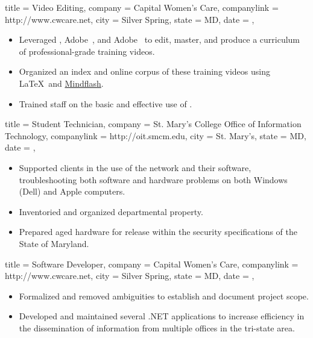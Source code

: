 \documentclass[
textout=\jobname.cv.txt,
textout preamble = preamble.txt,
]{bettercv}
\begin{document}
\begin{position}
  {
    title   = Video Editing,
    company = Capital Women's Care,
    companylink = http://www.cwcare.net,
    city    = Silver Spring,
    state   = MD,
    date    = ,
  }

\begin{itemize}
\item Leveraged ,
  Adobe~, and
  Adobe~ to edit, master, and produce
    a curriculum of professional-grade training videos.
  \item Organized an index and online corpus of these training videos
    using \LaTeX\ and \href{http://www.mindflash.com}{Mindflash}.
\item Trained staff on the basic and effective use of .
\end{itemize}
\end{position}

\begin{position}
  {
    title   = Student Technician,
    company = St. Mary's College \Dash Office of Information Technology,
    companylink = http://oit.smcm.edu,
    city    = St. Mary's,
    state   = MD,
    date    = ,
  }

\begin{itemize}
\item Supported clients in the use of the network and their software,
  troubleshooting both software and hardware problems on both Windows (Dell) and Apple computers.
\item Inventoried and organized departmental property.
\item Prepared aged hardware for release within the security specifications of the State of Maryland.
\end{itemize}
\end{position}

\begin{position}
  {
    title   = Software Developer,
    company = Capital Women's Care,
    companylink = http://www.cwcare.net,
    city    = Silver Spring,
    state   = MD,
    date    = ,
  }

\begin{itemize}
\item Formalized and removed ambiguities to establish and document project scope.
\item Developed and maintained several .NET applications to increase efficiency
  in the dissemination of information from multiple offices in the tri-state area.
\end{itemize}
\end{position}

\appendix
\todos
\end{document}
